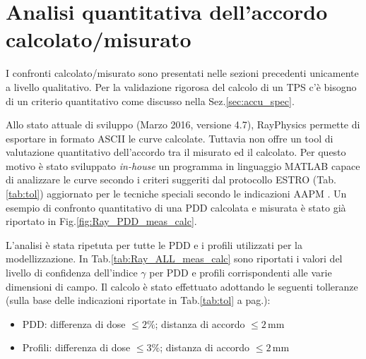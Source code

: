 \section{Analisi quantitativa dell'accordo calcolato/misurato}
I confronti calcolato/misurato sono presentati nelle sezioni precedenti unicamente a livello qualitativo. Per la validazione rigorosa del calcolo di un TPS c'è bisogno di un criterio quantitativo come discusso nella Sez.\ref{sec:accu_spec}. 

Allo stato attuale di sviluppo (Marzo 2016, versione 4.7), RayPhysics permette di esportare in formato ASCII le curve calcolate. Tuttavia non offre un tool di valutazione quantitativo dell'accordo tra il misurato ed il calcolato. Per questo motivo è stato sviluppato \textit{in-house} un programma in linguaggio MATLAB capace di analizzare le curve secondo i criteri suggeriti dal protocollo ESTRO \cite{Mijnheer2004} (Tab.\ref{tab:tol}) aggiornato per le tecniche speciali secondo le indicazioni AAPM \cite{Ezzell2009}. Un esempio di confronto quantitativo di una PDD calcolata e misurata è stato già riportato in Fig.\ref{fig:Ray_PDD_meas_calc}.

L'analisi è stata ripetuta per tutte le PDD e i profili utilizzati per la modellizzazione. In Tab.\ref{tab:Ray_ALL_meas_calc} sono riportati i valori del livello di confidenza dell'indice $\gamma$ per PDD e profili corrispondenti alle varie dimensioni di campo. Il calcolo è stato effettuato adottando le seguenti tolleranze (sulla base delle indicazioni riportate in Tab.\ref{tab:tol} a pag.\pageref{tab:tol}):
\begin{itemize}
\item PDD: differenza di dose $\leq 2\%$; distanza di accordo $\leq 2\,$mm
\item Profili: differenza di dose $\leq 3\%$; distanza di accordo $\leq 2\,$mm
\end{itemize}

